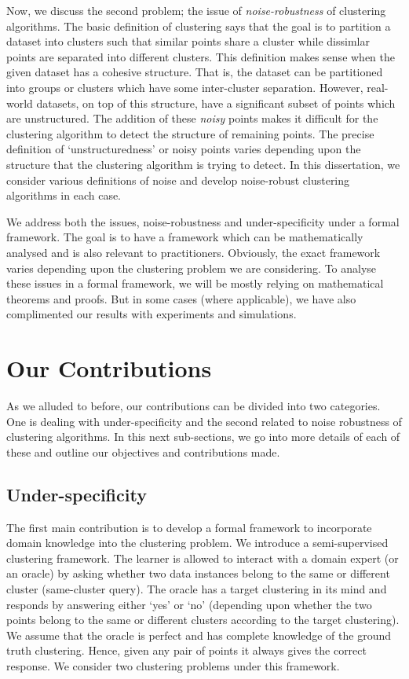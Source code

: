 \documentclass[12pt]{article}
\begin{document}
Now, we discuss the second problem; the issue of \textit{noise-robustness} of clustering algorithms. The basic definition of clustering says that the goal is to partition a dataset into clusters such that similar points share a cluster while dissimlar points are separated into different clusters. This definition makes sense when the given dataset has a cohesive structure. That is, the dataset can be partitioned into groups or clusters which have some inter-cluster separation. However, real-world datasets, on top of this structure, have a significant subset of points which are unstructured. The addition of these \textit{noisy} points makes it difficult for the clustering algorithm to detect the structure of remaining points. The precise definition of `unstructuredness' or noisy points varies depending upon the structure that the clustering algorithm is trying to detect. In this dissertation, we consider various definitions of noise and develop noise-robust clustering algorithms in each case.

We address both the issues, noise-robustness and under-specificity under a formal framework. The goal is to have a framework which can be mathematically analysed and is also relevant to practitioners. Obviously, the exact framework varies depending upon the clustering problem we are considering. To analyse these issues in a formal framework, we will be mostly relying on mathematical theorems and proofs. But in some cases (where applicable), we have also complimented our results with experiments and simulations. 

\section{Our Contributions} 
As we alluded to before, our contributions can be divided into two categories. One is dealing with under-specificity and the second related to noise robustness of clustering algorithms. In this next sub-sections, we go into more details of each of these and outline our  objectives and contributions made. 

\subsection{Under-specificity}
The first main contribution is to develop a formal framework to incorporate domain knowledge into the clustering problem. We introduce a semi-supervised clustering framework. The learner is allowed to interact with a domain expert (or an oracle) by asking whether two data instances belong to the same  or different cluster (same-cluster query). The oracle has a target clustering in its mind and responds by answering either `yes' or `no' (depending upon whether the two points belong to the same or different clusters according to the target clustering). We assume that the oracle is perfect and has complete knowledge of the ground truth clustering. Hence, given any pair of points it always gives the correct response. We consider two clustering problems under this framework.
\end{document}
